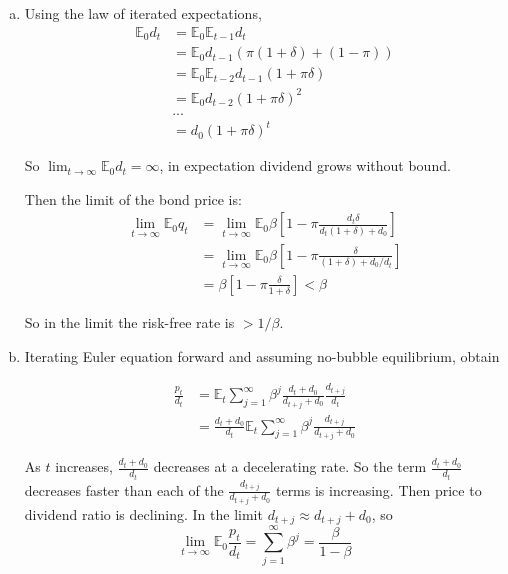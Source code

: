 \documentclass{article}
\newcommand{\E}{\mathbb{E}}
\begin{document}
\begin{enumerate}[(a)]
\item Using the law of iterated expectations,
  \begin{align*}
    \E_0d_t&=\E_0\E_{t-1}d_t\\
           &=\E_0d_{t-1}(\pi(1+\delta)+(1-\pi))\\
           &=\E_0\E_{t-2}d_{t-1}(1+\pi\delta)\\
           &=\E_0d_{t-2}(1+\pi\delta)^2\\
           &...\\
           &=d_0(1+\pi\delta)^t
  \end{align*}

  So $\lim_{t\to\infty}\E_0d_t=\infty$, in expectation dividend grows
  without bound.

  Then the limit of the bond price is:
  \begin{align*}
    \lim_{t\to\infty}\E_0q_t&=\lim_{t\to\infty}\E_0\beta[1-\pi\frac{d_t\delta}{d_{t}(1+\delta)+d_0}]\\
                            &=\lim_{t\to\infty}\E_0\beta[1-\pi\frac{\delta}{(1+\delta)+d_0/d_{t}}]\\
                            &=\beta[1-\pi\frac{\delta}{1+\delta}]<\beta
  \end{align*}

  So in the limit the risk-free rate is $>1/\beta$.


\item Iterating Euler equation forward and assuming no-bubble equilibrium, obtain

  \begin{align*}
    \frac{p_t}{d_t}&=\E_t\sum_{j=1}^\infty\beta^j\frac{d_t+d_0}{d_{t+j}+d_0}\frac{d_{t+j}}{d_t}\\
                   &=\frac{d_t+d_0}{d_t}\E_t\sum_{j=1}^\infty\beta^j\frac{d_{t+j}}{d_{t+j}+d_0}
  \end{align*}

  As $t$ increases, $\frac{d_t+d_0}{d_t}$ decreases at a decelerating
  rate. So the term $\frac{d_t+d_0}{d_t}$ decreases faster than each
  of the $\frac{d_{t+j}}{d_{t+j}+d_0}$ terms is increasing. Then price
  to dividend ratio is declining. In the limit
  $d_{t+j}\approx d_{t+j}+d_0$, so
  \begin{equation*}
    \lim_{t\to\infty}\E_0\frac{p_t}{d_t}=\sum_{j=1}^\infty\beta^j=\frac{\beta}{1-\beta}
  \end{equation*}

\end{enumerate}
\end{document}
